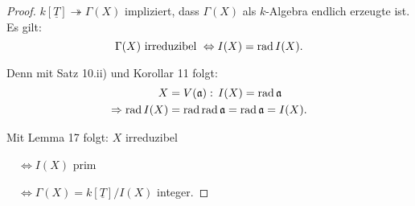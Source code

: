 \begin{proof}
  $k[\underline{T}]\twoheadrightarrow\Gamma(X)$ impliziert, dass $\Gamma(X)$ als $k$-Algebra endlich
  erzeugte ist. Es gilt:
  \[
    \Gamma(X)\text{ irreduzibel }\Leftrightarrow I(X)=\operatorname{rad} I(X).
  \]

  Denn mit Satz 10.ii) und Korollar 11 folgt:
  \begin{align*}
    X & =V(\mathfrak{a}):\,I(X)=\operatorname{rad}\mathfrak{a}\\
    \Rightarrow\operatorname{rad} I(X) & =\operatorname{rad}\operatorname{rad}\mathfrak{a}=\operatorname{rad}\mathfrak{a}=I(X).
  \end{align*}

  Mit Lemma 17 folgt: $X$ irreduzibel

  $\phantom{\quad}\Leftrightarrow I(X)$ prim

  $\phantom{\quad}\Leftrightarrow\Gamma(X)=k[\underline{T}]/I(X)$ integer.
\end{proof}

